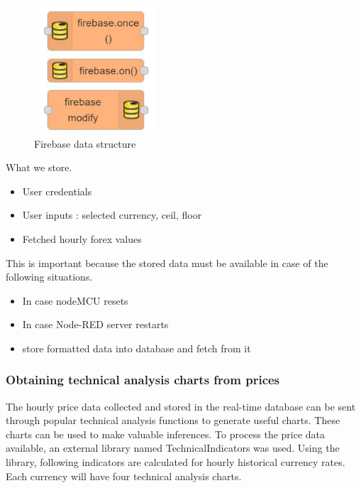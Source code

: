 \begin{figure}[H]
    \centering
      \includegraphics[width=0.4\textwidth]{images/firenodes.png}
    \caption{ Firebase data structure}
    \label{firenodes}
\end{figure}

What we store.

\begin{itemize}[itemsep=-1.7mm]
\item User credentials
\item User inputs : selected currency, ceil, floor
\item Fetched hourly forex values 
\end{itemize}


This is important because the stored data must be available in case of the following situations.

\begin{itemize}[itemsep=-1.7mm]
\item In case nodeMCU resets
\item In case Node-RED server restarts
\item store formatted data into database and fetch from it   
\end{itemize}

\subsubsection{Obtaining technical analysis charts from prices}

The hourly price data collected and stored in the real-time database can be sent through popular technical analysis functions to generate useful charts. These charts can be used to make valuable inferences. To process the price data available, an external library named TechnicalIndicators was used. Using the library, following indicators are calculated for hourly historical currency rates. Each currency will have four technical analysis charts.\\


